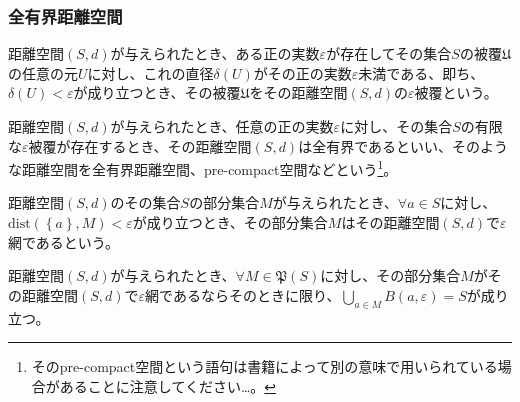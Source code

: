 \documentclass[dvipdfmx]{jsarticle}
\begin{document}
\subsubsection{全有界距離空間}%
\begin{dfn}
距離空間$(S,d)$が与えられたとき、ある正の実数$\varepsilon$が存在してその集合$S$の被覆$\mathfrak{U}$の任意の元$U$に対し、これの直径$\delta(U)$がその正の実数$\varepsilon$未満である、即ち、$\delta(U) < \varepsilon$が成り立つとき、その被覆$\mathfrak{U}$をその距離空間$(S,d)$の$\varepsilon$被覆という。
\end{dfn}
\begin{dfn}
距離空間$(S,d)$が与えられたとき、任意の正の実数$\varepsilon$に対し、その集合$S$の有限な$\varepsilon$被覆が存在するとき、その距離空間$(S,d)$は全有界であるといい、そのような距離空間を全有界距離空間、pre-compact空間などという\footnote{そのpre-compact空間という語句は書籍によって別の意味で用いられている場合があることに注意してください…。}。
\end{dfn}
\begin{dfn}
距離空間$(S,d)$のその集合$S$の部分集合$M$が与えられたとき、$\forall a \in S$に対し、$\mathrm{dist}\left( \left\{ a \right\},M \right) < \varepsilon$が成り立つとき、その部分集合$M$はその距離空間$(S,d)$で$\varepsilon$網であるという。
\end{dfn}
\begin{thm}\label{8.2.4.11}
距離空間$(S,d)$が与えられたとき、$\forall M \in \mathfrak{P}(S)$に対し、その部分集合$M$がその距離空間$(S,d)$で$\varepsilon$網であるならそのときに限り、$\bigcup_{a \in M} {B(a,\varepsilon)} = S$が成り立つ。
\end{thm}
\end{document}
